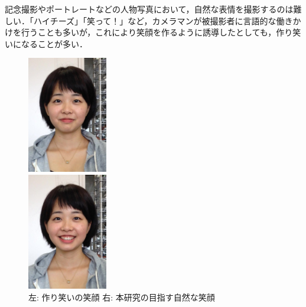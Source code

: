 \documentclass[submit,techreq]{ec2014}
\begin{document}
記念撮影やポートレートなどの人物写真において，自然な表情を撮影するのは難しい．「ハイチーズ」「笑って！」など，カメラマンが被撮影者に言語的な働きかけを行うことも多いが，これにより笑顔を作るように誘導したとしても，作り笑いになることが多い．


\begin{figure}[b!]
\begin{minipage}{0.49\columnwidth}
\begin{center}
\includegraphics[width=35mm, bb=0 0 572 834]{images/cap_28.jpg}
\end{center}
\end{minipage}
\begin{minipage}{0.49\columnwidth}
\begin{center}
\includegraphics[width=35mm, bb=0 0 572 834]{images/cap_123.jpg}
\end{center}
\end{minipage}
\label{hirashimasmile}
\begin{center}
\caption{左: 作り笑いの笑顔 右: 本研究の目指す自然な笑顔}

\end{center}
\end{figure}
\end{document}
